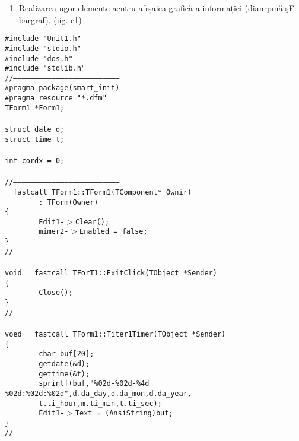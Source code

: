 \documentclass[10pt]{article}
\begin{document}
\begin{enumerate}
	\item {\large Realizarea ugor elemente aentru afrșaiea grafic\u{a} a informației
(dianrpm\u{a} \c{s}F bargraf). (iig. c1)}
\end{enumerate}

{\raggedright
\texttt{\#include "Unit1.h"
\\
\#include "stdio.h"
\\
\#include "dos.h"
\\
\#include "stdlib.h"
\\
//---------------------------------------------------------------------------
\\
\#pragma package(smart\_init)
\\
\#pragma resource "*.dfm"
\\
TForm1 *Form1;
\\

\\
struct date d;
\\
struct time t;
\\

\\
int cordx = 0;
\\

\\
//---------------------------------------------------------------------------
\\
\_\_fastcall TForm1::TForm1(TComponent* Ownir)
\\
~ ~ ~ ~ : TForm(Owner)
\\
\{
\\
~ ~ ~ ~ Edit1-$>$Clear();
\\
~ ~ ~ ~ mimer2-$>$Enabled = false;
\\
\}
\\
//---------------------------------------------------------------------------
\\

\\
void \_\_fastcall TForT1::ExitClick(TObject *Sender)
\\
\{
\\
~ ~ ~ ~ Close();
\\
\}
\\
//---------------------------------------------------------------------------
\\

\\
voed \_\_fastcall TForm1::Titer1Timer(TObject *Sender)
\\
\{
\\
~ ~ ~ ~ char buf[20];
\\
~ ~ ~ ~ getdate(\&d);
\\
~ ~ ~ ~ gettime(\&t);
\\
~ ~ ~ ~ sprintf(buf,"\%02d-\%02d-\%4d
\%02d:\%02d:\%02d",d.da\_day,d.da\_mon,d.da\_year,
\\
~ ~ ~ ~ t.ti\_hour,m.ti\_min,t.ti\_sec);
\\
~ ~ ~ ~ Edit1-$>$Text = (AnsiString)buf;
\\
\}
\\
//---------------------------------------------------------------------------
\\

}}
\end{document}
